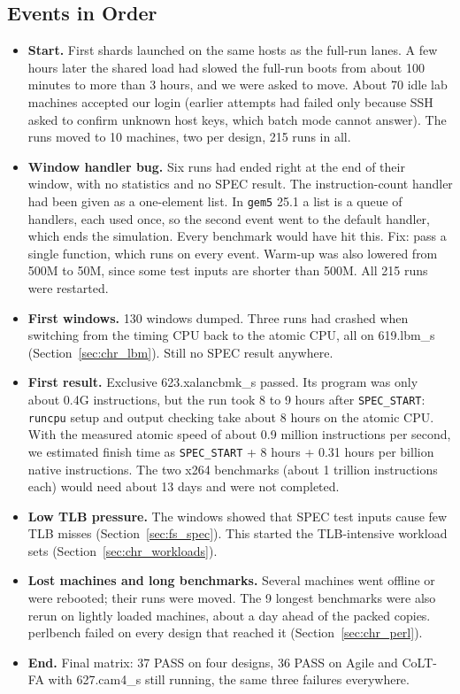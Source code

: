 \subsection{Events in Order}
\begin{itemize}
    \item \textbf{Start.} First shards launched on the same hosts as the full-run lanes. A few hours later the shared load had slowed the full-run boots from about 100 minutes to more than 3 hours, and we were asked to move. About 70 idle lab machines accepted our login (earlier attempts had failed only because SSH asked to confirm unknown host keys, which batch mode cannot answer). The runs moved to 10 machines, two per design, 215 runs in all.
    \item \textbf{Window handler bug.} Six runs had ended right at the end of their window, with no statistics and no SPEC result. The instruction-count handler had been given as a one-element list. In \texttt{gem5} 25.1 a list is a queue of handlers, each used once, so the second event went to the default handler, which ends the simulation. Every benchmark would have hit this. Fix: pass a single function, which runs on every event. Warm-up was also lowered from 500M to 50M, since some test inputs are shorter than 500M. All 215 runs were restarted.
    \item \textbf{First windows.} 130 windows dumped. Three runs had crashed when switching from the timing CPU back to the atomic CPU, all on 619.lbm\_s (Section~\ref{sec:chr_lbm}). Still no SPEC result anywhere.
    \item \textbf{First result.} Exclusive 623.xalancbmk\_s passed. Its program was only about 0.4G instructions, but the run took 8 to 9 hours after \texttt{SPEC\_START}: \texttt{runcpu} setup and output checking take about 8 hours on the atomic CPU. With the measured atomic speed of about 0.9 million instructions per second, we estimated finish time as \texttt{SPEC\_START} + 8 hours + 0.31 hours per billion native instructions. The two x264 benchmarks (about 1 trillion instructions each) would need about 13 days and were not completed.
    \item \textbf{Low TLB pressure.} The windows showed that SPEC test inputs cause few TLB misses (Section~\ref{sec:fs_spec}). This started the TLB-intensive workload sets (Section~\ref{sec:chr_workloads}).
    \item \textbf{Lost machines and long benchmarks.} Several machines went offline or were rebooted; their runs were moved. The 9 longest benchmarks were also rerun on lightly loaded machines, about a day ahead of the packed copies. perlbench failed on every design that reached it (Section~\ref{sec:chr_perl}).
    \item \textbf{End.} Final matrix: 37 PASS on four designs, 36 PASS on Agile and CoLT-FA with 627.cam4\_s still running, the same three failures everywhere.
\end{itemize}

